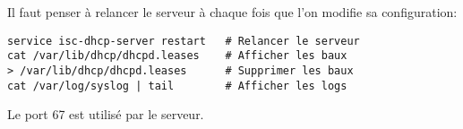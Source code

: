 \documentclass[10pt,a4paper,french]{article}
\begin{document}
Il faut penser à relancer le serveur à chaque fois que l'on modifie sa configuration:
\begin{verbatim}
service isc-dhcp-server restart   # Relancer le serveur
cat /var/lib/dhcp/dhcpd.leases    # Afficher les baux
> /var/lib/dhcp/dhcpd.leases      # Supprimer les baux
cat /var/log/syslog | tail        # Afficher les logs
\end{verbatim}

Le port 67 est utilisé par le serveur.
\end{document}
